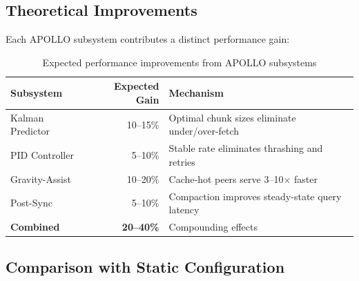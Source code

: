 \documentclass[11pt,a4paper]{article}
\begin{document}
\subsection{Theoretical Improvements}

Each APOLLO subsystem contributes a distinct performance gain:

\begin{table}[h]
\centering
\begin{tabular}{lrl}
\toprule
\textbf{Subsystem} & \textbf{Expected Gain} & \textbf{Mechanism} \\
\midrule
Kalman Predictor & 10--15\% & Optimal chunk sizes eliminate under/over-fetch \\
PID Controller & 5--10\% & Stable rate eliminates thrashing and retries \\
Gravity-Assist & 10--20\% & Cache-hot peers serve 3--10$\times$ faster \\
Post-Sync & 5--10\% & Compaction improves steady-state query latency \\
\midrule
\textbf{Combined} & \textbf{20--40\%} & Compounding effects \\
\bottomrule
\end{tabular}
\caption{Expected performance improvements from APOLLO subsystems}
\label{tab:improvements}
\end{table}

\subsection{Comparison with Static Configuration}
\end{document}
